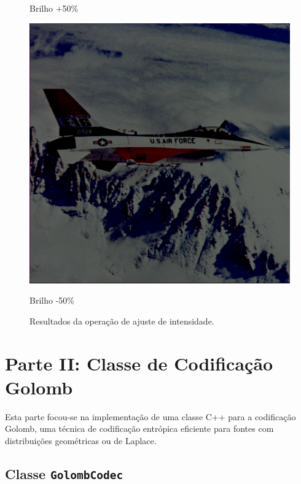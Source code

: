 \documentclass[a4paper, 11pt, portuguese]{article}
\begin{document}
\begin{figure}[htbp]
\begin{minipage}{0.32\textwidth}
    \caption*{Brilho +50\%}
\end{minipage}
\hfill
\begin{minipage}{0.32\textwidth}
    \centering
    \includegraphics[width=\textwidth]{imagens/airplane_darker_-50.png}
    \caption*{Brilho -50\%}
\end{minipage}
\caption{Resultados da operação de ajuste de intensidade.}
\label{fig:intensidade}
\end{figure}

\section{Parte II: Classe de Codificação Golomb}

Esta parte focou-se na implementação de uma classe C++ para a codificação Golomb, uma técnica de codificação entrópica eficiente para fontes com distribuições geométricas ou de Laplace.

\subsection{Classe \texttt{GolombCodec}} %
\end{document}
